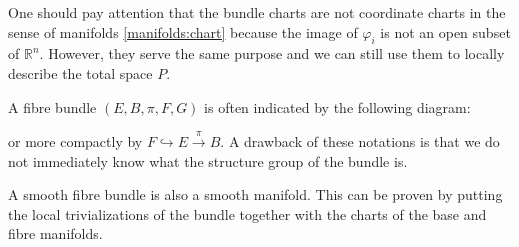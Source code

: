    \begin{remark}
        One should pay attention that the bundle charts are not coordinate charts in the sense of manifolds \ref{manifolds:chart} because the image of $\varphi_i$ is not an open subset of $\mathbb{R}^n$. However, they serve the same purpose and we can still use them to locally describe the total space $P$.
    \end{remark}
    \begin{notation}
        A fibre bundle $(E, B, \pi, F, G)$ is often indicated by the following diagram:

        \begin{figure}[ht!]
            \centering
        \end{figure}
        or more compactly by $F\hookrightarrow E\xrightarrow{\ \pi\ }{B}$. A drawback of these notations is that we do not immediately know what the structure group of the bundle is.
    \end{notation}


    \begin{remark}
        A smooth fibre bundle is also a smooth manifold. This can be proven by putting the local trivializations of the bundle together with the charts of the base and fibre manifolds.
    \end{remark}

